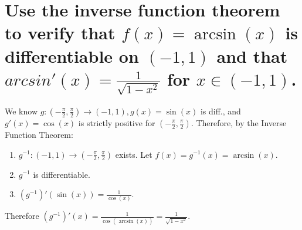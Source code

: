\section{Use the inverse function theorem to verify 
    that $f(x) = \arcsin(x)$ is differentiable on $(-1,1)$ 
    and that $arcsin'(x) = \frac{1}{\sqrt{1-x^2}}$ for $x \in (-1,1)$.}

    We know $g: (-\frac{\pi}{2},\frac{\pi}{2}) \to (-1,1), g(x) = \sin(x)$ is diff.,
    and $g'(x) = \cos(x)$ is strictly positive for $(-\frac{\pi}{2},\frac{\pi}{2})$.
    Therefore, by the Inverse Function Theorem:
    \begin{enumerate}
        \item $g^{-1}: (-1,1) \to (-\frac{\pi}{2},\frac{\pi}{2})$ exists. 
            Let $f(x) = g^{-1}(x) = \arcsin(x)$.
        \item $g^{-1}$ is differentiable.
        \item $(g^{-1})'(\sin(x)) = \frac{1}{\cos(x)}$.
    \end{enumerate}
    Therefore $(g^{-1})'(x) = \frac{1}{\cos(\arcsin(x))} = \frac{1}{\sqrt{1-x^2}}$.